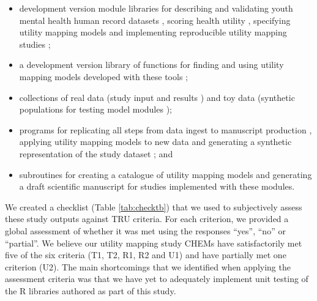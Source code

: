 \documentclass[sn-vancouver,Numbered,pdflatex]{sn-jnl}
\theoremstyle{remark}
\theoremstyle{definition}
\begin{document}
\begin{itemize}
\item
  development version module libraries for describing and validating youth mental health human record datasets \citep{hamilton_matthew_2022_6084467}, scoring health utility \citep{hamilton_matthew_2022_6084824}, specifying utility mapping models \citep{hamilton_matthew_2022_6116701} and implementing reproducible utility mapping studies \citep{gao_caroline_2022_6130155};
\item
  a development version library of functions for finding and using utility mapping models developed with these tools \citep{matthew_p_hamilton_2021_5646669};
\item
  collections of real data (study input and results \citep{DVN/DKDIB0_2021}) and toy data (synthetic populations for testing model modules \citep{DVN/HJXYKQ_2021});
\item
  programs for replicating all steps from data ingest to manuscript production \citep{hamilton_matthew_2022_6129906}, applying utility mapping models to new data \citep{hamilton_matthew_2022_6416330} and generating a synthetic representation of the study dataset \citep{hamilton_matthew_p_2022_6321821}; and
\item
  subroutines for creating a catalogue of utility mapping models \citep{hamilton_matthew_2022_6116385} and generating a draft scientific manuscript \citep{matthew_p_hamilton_2022_5976988} for studies implemented with these modules.
\end{itemize}

We created a checklist (Table \ref{tab:checktb}) that we used to subjectively assess these study outputs against TRU criteria. For each criterion, we provided a global assessment of whether it was met using the responses ``yes'', ``no'' or ``partial''. We believe our utility mapping study CHEMs have satisfactorily met five of the six criteria (T1, T2, R1, R2 and U1) and have partially met one criterion (U2). The main shortcomings that we identified when applying the assessment criteria was that we have yet to adequately implement unit testing of the R libraries authored as part of this study.
\end{document}
